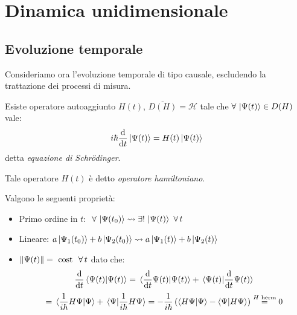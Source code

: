 
\chapter{Dinamica unidimensionale}

\section{Evoluzione temporale}
Consideriamo ora l'evoluzione temporale di tipo causale, escludendo la trattazione dei processi di misura.

\begin{postulato7}
    Esiste operatore autoaggiunto \(H(t)\), \(\overline{D(H)}= \mathcal{H}\) tale che \(\forall\, \ket{\Psi(t)}\in D(H)\) vale:
    \begin{equation}
        i\hbar \dv{t}\ket{\Psi(t)}= H(t)\ket{\Psi(t)}
    \end{equation}
    detta \textit{equazione di Schrödinger}.
\end{postulato7}

\begin{definition}
    Tale operatore \(H(t )\) è detto \textit{operatore hamiltoniano}.
\end{definition}

Valgono le seguenti proprietà:
\begin{itemize}
    \item Primo ordine in \(t\): \(\ \forall\, \ket{\Psi(t_0)} \rightsquigarrow \exists! \,\ket{\Psi(t)} \ \forall\, t\) 
    \item Lineare: \(a\ket{\Psi_1(t_0)}+b\ket{\Psi_2(t_0)}\rightsquigarrow a\ket{\Psi_1(t)}+b\ket{\Psi_2(t)}\)
    \item \(\norm{\Psi(t)}= \text{ cost } \ \forall \,t\) dato che:
    \[
        \dv{t}\braket{\Psi(t)}{\Psi(t)} =
        \braket*{\dv{t}\Psi(t)}{\Psi(t)} + \braket*{\Psi(t)}{\dv{t}\Psi(t)}
    \]
    \[
        = \braket*{\frac{1}{i\hbar}H\Psi}{\Psi} + \braket*{\Psi}{\frac{1}{i\hbar}H\Psi}
        = -\frac{1}{i\hbar}\left( \braket{H\Psi}{\Psi} - \braket{\Psi}{H\Psi} \right)
        \overset{H \text{ herm}}{=} 0
    \]
\end{itemize}

